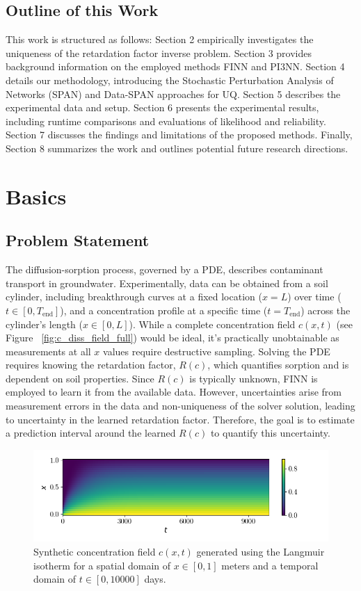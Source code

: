 \subsection{Outline of this Work}
This work is structured as follows: Section 2 empirically investigates the uniqueness of the retardation factor inverse problem. Section 3 provides background information on the employed methods FINN and PI3NN. Section 4 details our methodology, introducing the Stochastic Perturbation Analysis of Networks (SPAN) and Data-SPAN approaches for UQ. Section 5 describes the experimental data and setup. Section 6 presents the experimental results, including runtime comparisons and evaluations of likelihood and reliability. Section 7 discusses the findings and limitations of the proposed methods. Finally, Section 8 summarizes the work and outlines potential future research directions.



\section{Basics}

\subsection{Problem Statement}
The diffusion-sorption process, governed by a PDE, describes contaminant transport in groundwater. Experimentally, data can be obtained from a soil cylinder, including breakthrough curves at a fixed location ($x=L$) over time ($t \in [0, T_{\text{end}}]$), and a concentration profile at a specific time ($t=T_{\text{end}}$) across the cylinder's length ($x \in [0,L]$). While a complete concentration field $c(x,t)$ (see Figure ~\vref{fig:c_diss_field_full}) would be ideal, it's practically unobtainable as measurements at all $x$ values require destructive sampling. Solving the PDE requires knowing the retardation factor, $R(c)$, which quantifies sorption and is dependent on soil properties. Since $R(c)$ is typically unknown, FINN is employed to learn it from the available data. However, uncertainties arise from measurement errors in the data and non-uniqueness of the solver solution, leading to uncertainty in the learned retardation factor. Therefore, the goal is to estimate a prediction interval around the learned $R(c)$ to quantify this uncertainty.

\begin{figure}[h]
    \centering
    \includegraphics{figs/c_diss_field_full.png}
    \caption{Synthetic concentration field $c(x,t)$ generated using the Langmuir isotherm for a spatial domain of $x \in [0, 1]$ meters and a temporal domain of $t \in [0, 10000]$ days.}
    \label{fig:c_diss_field_full}
\end{figure}


